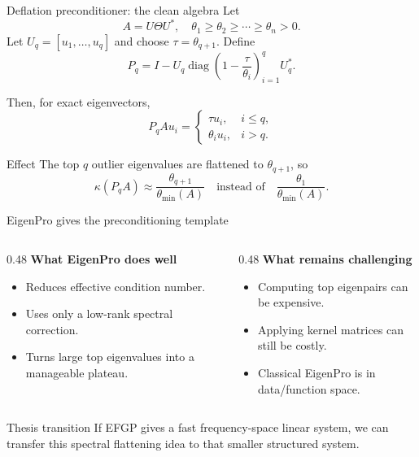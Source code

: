 \documentclass[aspectratio=169,10pt]{beamer}
\begin{document}
\begin{frame}{Deflation preconditioner: the clean algebra}
Let
\[
A = U\Theta U^*, \quad \theta_1\ge \theta_2\ge\cdots\ge\theta_n>0.
\]
Let $U_q=[u_1,\dots,u_q]$ and choose $\tau=\theta_{q+1}$. Define
\[
P_q = I-U_q\operatorname{diag}\!\left(1-\frac{\tau}{\theta_i}\right)_{i=1}^q U_q^*.
\]

Then, for exact eigenvectors,
\[
P_q A u_i =
\begin{cases}
\tau u_i, & i\le q,\\
\theta_i u_i, & i>q.
\end{cases}
\]

\begin{block}{Effect}
The top $q$ outlier eigenvalues are flattened to $\theta_{q+1}$, so
\[
\kappa(P_qA)\approx \frac{\theta_{q+1}}{\theta_{\min}(A)}
\quad \text{instead of}\quad
\frac{\theta_1}{\theta_{\min}(A)}.
\]
\end{block}
\end{frame}

\begin{frame}{EigenPro gives the preconditioning template}
\begin{columns}[T,totalwidth=\textwidth]
\begin{column}{0.48\textwidth}
\textbf{What EigenPro does well}
\begin{itemize}
  \item Reduces effective condition number.
  \item Uses only a low-rank spectral correction.
  \item Turns large top eigenvalues into a manageable plateau.
\end{itemize}
\end{column}
\begin{column}{0.48\textwidth}
\textbf{What remains challenging}
\begin{itemize}
  \item Computing top eigenpairs can be expensive.
  \item Applying kernel matrices can still be costly.
  \item Classical EigenPro is in data/function space.
\end{itemize}
\end{column}
\end{columns}

\vspace{0.8em}
\begin{alertblock}{Thesis transition}
If EFGP gives a fast frequency-space linear system, we can transfer this spectral flattening idea to that smaller structured system.
\end{alertblock}
\end{frame}
\end{document}
